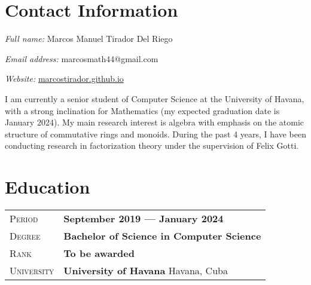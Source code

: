 \documentclass[12pt]{amsart}
\theoremstyle{definition}
\numberwithin{equation}{section}
\newcommand{\gray}{\rowcolor[gray]{.90}} %
\begin{document}
	
	
	
%	
%	
	
		

\date{\today}

	

\section{Contact Information}
	\textit{Full name:} Marcos Manuel Tirador Del Riego
	
	\textit{Email address:} marcosmath44@gmail.com
	
	\textit{Website:} \href{marcostirador.github.io}{marcostirador.github.io}
	
	\vspace{0.5cm}
	
	I am currently a senior student of Computer Science at the University of Havana, with a strong inclination for Mathematics (my expected graduation date is January 2024). My main research interest is algebra with emphasis on the atomic structure of commutative rings and monoids. During the past 4 years, I have been conducting research in factorization theory under the supervision of Felix Gotti.
	
\section{Education}

	\begin{tabularx}{0.97\linewidth}{>{\raggedleft\scshape}p{2cm}X}
	\gray Period & \textbf{September 2019 --- January 2024}\\
	\gray Degree & \textbf{Bachelor of Science in Computer Science}\\
	\gray Rank & \textbf{To be awarded}\\
	\gray University & \textbf{University of Havana} \hfill Havana, Cuba\\
	\end{tabularx}
	
\end{document}
